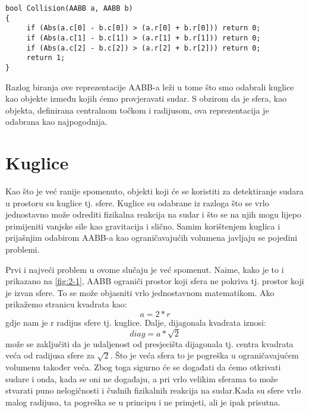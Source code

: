 \begin{lstlisting}[style={myC++},label={code:6},caption={Provjeravanje sudara za centar-radijus reprezentaciju AABB-a\cite{1}}]
bool Collision(AABB a, AABB b)
{
	 if (Abs(a.c[0] - b.c[0]) > (a.r[0] + b.r[0])) return 0;
	 if (Abs(a.c[1] - b.c[1]) > (a.r[1] + b.r[1])) return 0;
	 if (Abs(a.c[2] - b.c[2]) > (a.r[2] + b.r[2])) return 0;
	 return 1;
}
\end{lstlisting}

Razlog biranja ove reprezentacije AABB-a leži u tome što smo odabrali kuglice kao objekte između kojih ćemo provjeravati sudar. S obzirom da je sfera, kao objekta, definirana centralnom točkom i radijusom, ova reprezentacija je odabrana kao najpogodnija.

\section{Kuglice}\label{sec:balls}

Kao što je već ranije spomenuto, objekti koji će se koristiti za detektiranje sudara u prostoru su kuglice tj. sfere. Kuglice su odabrane iz razloga što se vrlo jednostavno može odrediti fizikalna reakcija na sudar i što se na njih mogu lijepo primijeniti vanjske sile kao gravitacija i slično. Samim korištenjem kuglica i prijašnjim odabirom AABB-a kao ograničavajućih volumena javljaju se pojedini problemi.

Prvi i najveći problem u ovome slučaju je već spomenut. Naime, kako je to i prikazano na \ref{fig:2-1}, AABB ograniči prostor koji sfera ne pokriva tj. prostor koji je izvan sfere. To se može objasniti vrlo jednostavnom matematikom. Ako prikažemo stranicu kvadrata kao:
\begin{equation}
a = 2*r \label{eq:stranica}
\end{equation}
gdje nam je r radijus sfere tj. kuglice. Dalje, dijagonala kvadrata iznosi:
\begin{equation}
diag = a * \sqrt{2} \label{eq:dijagonala}
\end{equation}
može se zaključiti da je udaljenost od presjecišta dijagonala tj. centra kvadrata veća od radijusa sfere za $\sqrt{2}$. Što je veća sfera to je pogreška u ograničavajućem volumenu također veća. Zbog toga sigurno će se događati da ćemo otkrivati sudare i onda, kada se oni ne događaju, a pri vrlo velikim sferama to može stvarati puno nelogičnosti i čudnih fizikalnih reakcija na sudar.Kada su sfere vrlo malog radijusa, ta pogreška se u principu i ne primjeti, ali je ipak prisutna.


